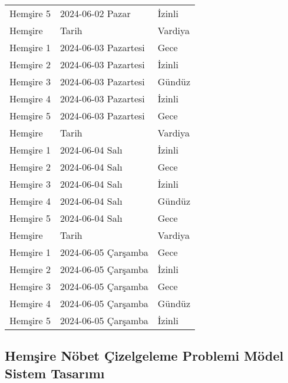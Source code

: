 \documentclass[12pt, a4paper]{article}
\begin{document}
\begin{flushleft}
\begin{table}
\begin{tabular}{l|l|l|}
	Hemşire	5 & 2024-06-02 Pazar & İzinli \\
	\rowcolor{yellow}
	\hline Hemşire & Tarih & Vardiya  \\
	\hline
	Hemşire 1  & 2024-06-03 Pazartesi  &  Gece  \\
	Hemşire	2 & 2024-06-03 Pazartesi & İzinli  \\
	Hemşire	3 & 2024-06-03 Pazartesi & Gündüz \\
	Hemşire	4 & 2024-06-03 Pazartesi & İzinli \\
	Hemşire	5 & 2024-06-03 Pazartesi & Gece \\
	\rowcolor{yellow}
	\hline Hemşire & Tarih & Vardiya  \\
	\hline
	Hemşire 1  & 2024-06-04 Salı  &  İzinli  \\
	Hemşire	2 & 2024-06-04 Salı & Gece  \\
	Hemşire	3 & 2024-06-04 Salı & İzinli \\
	Hemşire	4 &2024-06-04 Salı & Gündüz \\
	Hemşire	5 & 2024-06-04 Salı & Gece \\
	\rowcolor{yellow}
	\hline Hemşire & Tarih & Vardiya  \\
	\hline
	Hemşire 1  & 2024-06-05 Çarşamba  &  Gece  \\
	Hemşire	2 & 2024-06-05 Çarşamba & İzinli  \\
	Hemşire	3 & 2024-06-05 Çarşamba & Gece \\
	Hemşire	4 & 2024-06-05 Çarşamba& Gündüz \\
	Hemşire	5 & 2024-06-05 Çarşamba & İzinli \\
\end{tabular}

\end{table}




\newpage



\subsection{Hemşire Nöbet Çizelgeleme Problemi Mödel Sistem Tasarımı}



\end{flushleft}
\end{document}
